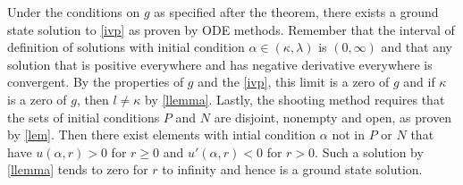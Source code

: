 Under the conditions on $g$ as specified after the theorem, there exists a ground state solution to \eqref{ivp} as proven by ODE methods. Remember that the interval of definition of solutions with initial condition $\alpha\in(\kappa,\lambda)$ is $(0,\infty)$ and that any solution that is positive everywhere and has negative derivative everywhere is convergent. By the properties of $g$ and the \eqref{ivp}, this limit is a zero of $g$ and if $\kappa$ is a zero of $g$, then $l\neq\kappa$ by \cref{llemma}. Lastly, the shooting method requires that the sets of initial conditions $P$ and $N$ are disjoint, nonempty and open, as proven by \cref{lem}. Then there exist elements with intial condition $\alpha$ not in $P$ or $N$ that have $u(\alpha,r)>0$ for $r\geq0$ and $u'(\alpha,r)<0$ for $r>0$. Such a solution by \cref{llemma} tends to zero for $r$ to infinity and hence is a ground state solution.









